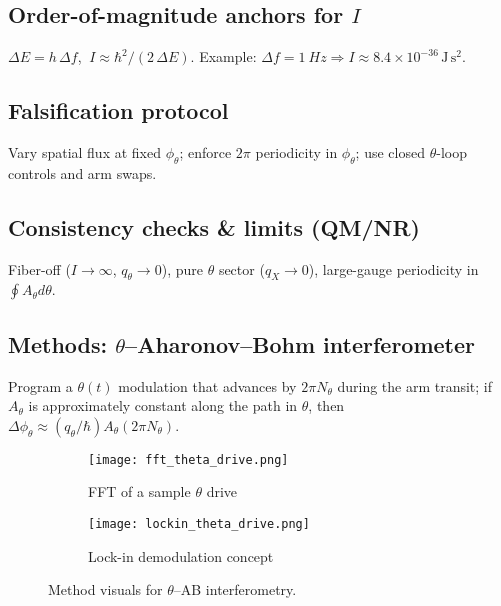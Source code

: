 
\subsection{Order-of-magnitude anchors for \texorpdfstring{$I$}{I}}\label{sec:iom}
$\Delta E=h\,\Delta f$, $\ I\approx \hbar^2/(2\,\Delta E)$. Example: $\Delta f=\SI{1}{Hz}\Rightarrow I\approx 8.4\times 10^{-36}\,\mathrm{J\,s^2}$.

\subsection{Falsification protocol}\label{sec:falsification}
Vary spatial flux at fixed $\phi_\theta$; enforce $2\pi$ periodicity in $\phi_\theta$; use closed $\theta$-loop controls and arm swaps.

\subsection{Consistency checks \& limits (QM/NR)}\label{sec:lab-consistency}
Fiber-off ($I\to\infty$, $q_\theta\to 0$), pure $\theta$ sector ($q_X\to 0$), large-gauge periodicity in $\oint A_\theta d\theta$.

\subsection{Methods: \texorpdfstring{$\theta$}{theta}--Aharonov--Bohm interferometer}\label{sec:methods-theta-ab}
Program a $\theta(t)$ modulation that advances by $2\pi N_\theta$ during the arm transit; if $A_\theta$ is approximately constant along the path in $\theta$, then $\Delta\phi_\theta \approx (q_\theta/\hbar) A_\theta (2\pi N_\theta)$.

\begin{figure}[h]
  \centering
  \begin{subfigure}[b]{0.48\linewidth}
    \centering
  \texttt{[image: fft\_theta\_drive.png]}
    \caption{FFT of a sample $\theta$ drive}
    \label{fig:fft-theta}
  \end{subfigure}\hfill
  \begin{subfigure}[b]{0.48\linewidth}
    \centering
  \texttt{[image: lockin\_theta\_drive.png]}
    \caption{Lock-in demodulation concept}
    \label{fig:lockin-theta}
  \end{subfigure}
  \caption{Method visuals for $\theta$--AB interferometry.}
  \label{fig:methods}
\end{figure}

